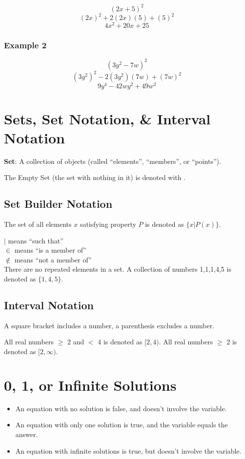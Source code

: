 \documentclass{article}
\begin{document}
$$(2x + 5)^2$$
$$(2x)^2 + 2(2x)(5) + (5)^2$$
$$4x^2 + 20x + 25$$

\subsubsection{Example 2}
$$ (3y^2 - 7w)^2 $$
$$ (3y^2)^2 - 2(3y^2)(7w) + (7w)^2$$
$$ 9y^4 - 42wy^2 + 49w^2 $$ 

\section{Sets, Set Notation, \& Interval Notation}
\noindent \textbf{Set}: A collection of objects (called ``elements'', ``members'', or ``points'').

The Empty Set (the set with nothing in it) is denoted with \emptyset. 
\subsection{Set Builder Notation}
The set of all elements $x$ satisfying property $P$ is denoted as $\{x | P(x)\}$.

$|$ means ``such that'' \\ 
$\in$ means ``is a member of''\\
$\notin$ means ``not a member of''\\
There are no repeated elements in a set. A collection of numbers 1,1,1,4,5 is denoted as $\{1,4,5\}$.
\subsection{Interval Notation}
A square bracket includes a number, a parenthesis excludes a number.

All real numbers $\geq$ 2 and $<$ 4 is denoted as $[2, 4)$.
All real numbers $\geq$ 2 is denoted as $[2,\infty)$.

\section{0, 1, or Infinite Solutions}

\begin{itemize}
\item An equation with no solution is false, and doesn't involve the variable.

\item An equation with only one solution is true, and the variable equals the answer.

\item An equation with infinite solutions is true, but doesn't involve the variable.
\end{itemize}
\end{document}
